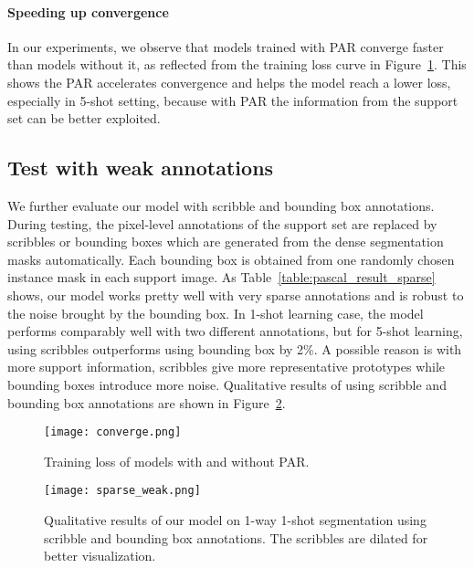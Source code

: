 \documentclass[10pt,twocolumn,letterpaper]{article}
\begin{document}
\vspace{-12pt}
\paragraph{Speeding up convergence} In our experiments, we observe that models trained  with  PAR  converge faster than models without it, as reflected from the training loss curve  in Figure~\ref{fig:converge}. This shows the PAR accelerates convergence and helps the model reach a lower loss, especially in 5-shot setting, because with PAR the information from the support set can be better exploited.

\subsection{Test with weak annotations} \label{sec:weak}

We further evaluate our model with scribble and bounding box annotations. During testing, the pixel-level annotations of the support set are replaced by scribbles or bounding boxes which are generated from the dense segmentation masks automatically. Each bounding box is obtained from one randomly chosen instance mask in each support image. As Table~\ref{table:pascal_result_sparse} shows, our model works pretty well with very sparse annotations and is robust to the noise brought by the bounding box. In 1-shot learning case, the model performs comparably well with two different annotations,  but for 5-shot learning, using scribbles outperforms using bounding box by 2\%. A possible reason is with more support information, scribbles give more representative prototypes while bounding boxes introduce more noise.
Qualitative results of using scribble and bounding box annotations are shown in Figure~\ref{fig:sparse}. 


\begin{figure}[t!]
\begin{center}
   \texttt{[image: converge.png]}
\end{center}
   \caption{Training loss of models with and without PAR.}
\label{fig:converge}
\end{figure}

\begin{figure}[t!]
\begin{center}
   \texttt{[image: sparse\_weak.png]}
\end{center}
   \caption{Qualitative results of our model on 1-way 1-shot segmentation using scribble and bounding box annotations. The scribbles are dilated for better visualization.}
\label{fig:sparse}
\end{figure}
\end{document}
